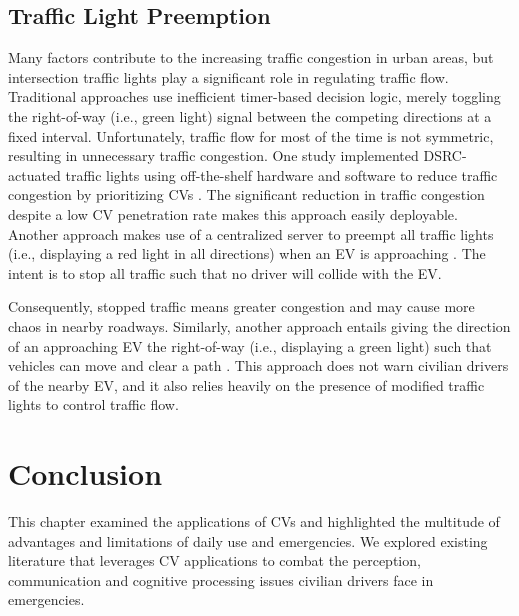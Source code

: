 \subsection{Traffic Light Preemption}
Many factors contribute to the increasing traffic congestion in urban areas, but intersection traffic lights play a significant role in regulating traffic flow. Traditional approaches use inefficient timer-based decision logic, merely toggling the right-of-way (i.e., green light) signal between the competing directions at a fixed interval. Unfortunately, traffic flow for most of the time is not symmetric, resulting in unnecessary traffic congestion. One study implemented \acrshort{DSRC}-actuated traffic lights using off-the-shelf hardware and software to reduce traffic congestion by prioritizing CVs \cite{Tonguz2020}. The significant reduction in traffic congestion despite a low CV penetration rate makes this approach easily deployable. Another approach makes use of a centralized server to preempt all traffic lights (i.e., displaying a red light in all directions) when an EV is approaching \cite{Vlad2008}. The intent is to stop all traffic such that no driver will collide with the EV.
 
Consequently, stopped traffic means greater congestion and may cause more chaos in nearby roadways. Similarly, another approach entails giving the direction of an approaching EV the right-of-way (i.e., displaying a green light) such that vehicles can move and clear a path \cite{Buchenscheit2009}. This approach does not warn civilian drivers of the nearby EV, and it also relies heavily on the presence of modified traffic lights to control traffic flow.

\section{Conclusion}
This chapter examined the applications of CVs and highlighted the multitude of advantages and limitations of daily use and emergencies. We explored existing literature that leverages CV applications to combat the perception, communication and cognitive processing issues civilian drivers face in emergencies.